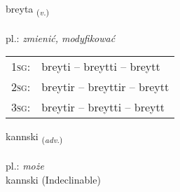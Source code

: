 \documentclass[frontgrid, backgrid]{flacards}\usepackage[]{graphicx}\usepackage[]{xcolor}
\begin{document}
\renewcommand{\flhead}{\vskip5pt \fboxsep=0pt {\small\bfseries\footnotesize Sagnorð | czasownik}}
\renewcommand{\fcfoot}{\vskip5pt \fboxsep=0pt \hspace{2pt}{\small\bfseries\footnotesize 1K}}

\renewcommand{\blhead}{\vskip5pt {\small\bfseries\footnotesize Sagnorð | czasownik }}
\renewcommand{\bcfoot}{\vskip5pt \hspace{2pt}{\small\bfseries\footnotesize 1K}}


{breyta \small{\textsubscript{(\textit{v.})}} \\[1ex] %
\textphonetic{[preiːta]} \\
pl.: \emph{zmienić, modyfikować} \\  [2ex]
\renewcommand*{\arraystretch}{0.8}
\begin{tabular}{p{1cm}l}
\textsc{1sg}: & breyti -- breytti -- breytt \\ 
\textsc{2sg}: & breytir -- breyttir -- breytt \\ 
\textsc{3sg}: & breytir -- breytti -- breytt \\ 
\end{tabular}
}


\renewcommand{\flhead}{\vskip5pt \fboxsep=0pt {\small\bfseries\footnotesize Atviksorð | przysłówek}}
\renewcommand{\fcfoot}{\vskip5pt \fboxsep=0pt \hspace{2pt}{\small\bfseries\footnotesize 1K}}

\renewcommand{\blhead}{\vskip5pt {\small\bfseries\footnotesize Atviksorð | przysłówek }}
\renewcommand{\bcfoot}{\vskip5pt \hspace{2pt}{\small\bfseries\footnotesize 1K}}


{kannski \small{\textsubscript{(\textit{adv.})}} \\[1ex]
\textphonetic{[kʰanscɪ]} \\
pl.: \emph{może} \\  [2ex]
kannski (Indeclinable)}
\end{document}

